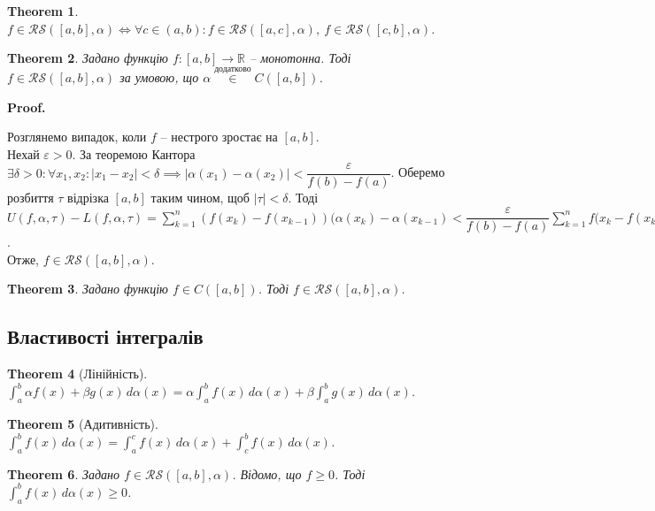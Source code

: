 \documentclass[a4paper, 10pt]{article}
\makeatletter
\def\qed{$\blacksquare$}
\theoremstyle{theoremdd}
\newtheorem{theorem}{Theorem}[subsection]
\theoremstyle{theoremdd}
\theoremstyle{theoremdd}
\theoremstyle{theoremdd}
\theoremstyle{theoremdd}
\theoremstyle{theoremdd}
\theoremstyle{theoremdd}
\theoremstyle{theoremdd}
\theoremstyle{theoremdd}
\renewenvironment{proof}[1][Proof.\\]{\par
\pushQED{\hfill \qed}%
\normalfont \topsep6\p@\@plus6\p@\relax
\trivlist
\item\relax
{\bfseries
#1\@addpunct{.}}\hspace\labelsep\ignorespaces
}{%
\popQED\endtrivlist\@endpefalse
}
\makeatother
\begin{document}
\begin{theorem}
$f \in \mathcal{RS}([a,b],\alpha) \iff \forall c \in (a,b): f \in \mathcal{RS}([a,c],\alpha),\ f \in \mathcal{RS}([c,b],\alpha)$.
\end{theorem}

\begin{theorem}
Задано функцію $f \colon [a,b] \to \mathbb{R}$ -- монотонна. Тоді $f \in \mathcal{RS}([a,b],\alpha)$ за умовою, що $\alpha \overset{\text{додатково}}{\in} C([a,b])$.
\end{theorem}

\begin{proof}
Розглянемо випадок, коли $f$ -- нестрого зростає на $[a,b]$.\\
Нехай $\varepsilon > 0$. За теоремою Кантора $\exists \delta > 0: \forall x_1,x_2: |x_1 - x_2| < \delta \implies |\alpha(x_1) - \alpha(x_2)| < \dfrac{\varepsilon}{f(b)-f(a)}$. Оберемо розбиття $\tau$ відрізка $[a,b]$ таким чином, щоб $|\tau| < \delta$. Тоді\\
$U(f,\alpha,\tau) - L(f,\alpha,\tau) = \displaystyle\sum_{k=1}^n (f(x_k) - f(x_{k-1})) (\alpha(x_k) - \alpha(x_{k-1}) < \dfrac{\varepsilon}{f(b)-f(a)} \sum_{k=1}^n f(x_{k} - f(x_{k-1}) = \varepsilon$.\\
Отже, $f \in \mathcal{RS}([a,b],\alpha)$.
\end{proof}

\begin{theorem}
Задано функцію $f \in C([a,b])$. Тоді $f \in \mathcal{RS}([a,b],\alpha)$.
\end{theorem}

\subsection{Властивості інтегралів}
\begin{theorem}[Лінійність]
$\displaystyle\int_a^b \alpha f(x)+ \beta g(x)\,d\alpha(x) = \alpha \int_a^b f(x)\,d\alpha(x) + \beta \int_a^b g(x)\,d\alpha(x)$.
\end{theorem}

\begin{theorem}[Адитивність]
$\displaystyle\int_a^b f(x)\,d\alpha(x) = \int_a^c f(x)\,d\alpha(x) + \int_c^b f(x)\,d\alpha(x)$.
\end{theorem}

\begin{theorem}
Задано $f \in \mathcal{RS}([a,b],\alpha)$. Відомо, що $f \geq 0$. Тоді $\displaystyle\int_a^b f(x)\,d\alpha(x) \geq 0$.
\end{theorem}
\end{document}
